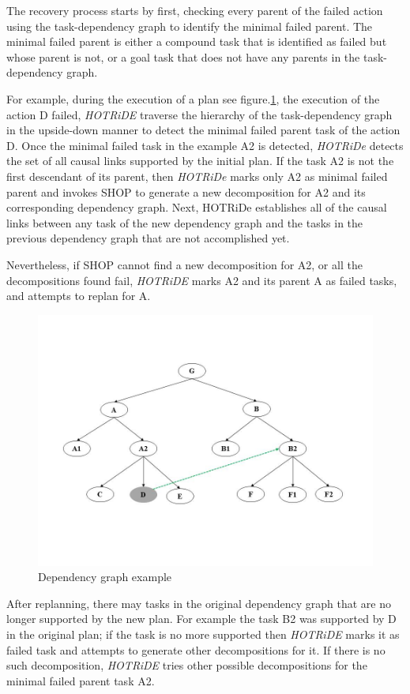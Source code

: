 The recovery process starts by first, checking every parent of the failed action using the task-dependency graph to identify the minimal failed parent. 
The minimal failed parent is either a compound task that is identified as failed but whose parent is not, or a goal task that does not have any parents in the task-dependency graph.

For example, during the execution of a plan see figure.\ref{Dependency graph}, the execution of the action D failed, \textit{HOTRiDE} traverse the hierarchy of the task-dependency graph in the upside-down manner to detect the minimal failed parent task of the action D. 
Once the minimal failed task in the example A2 is detected, \textit{HOTRiDe} detects the set of all causal links supported by the initial plan.
If the task A2 is not the first descendant of its parent, then \textit{HOTRiDe} marks only A2 as minimal failed parent and invokes SHOP to generate a new decomposition for A2 and its corresponding dependency graph. 
Next, HOTRiDe establishes all of the causal links between any task of the new dependency graph and the tasks in the previous dependency graph that are not accomplished yet. 

Nevertheless, if SHOP cannot find a new decomposition for A2, or all the decompositions found fail, \textit{HOTRiDE} marks A2 and its parent A as failed tasks, and attempts to replan for A.

\begin{figure}[h]
	\centering
	\includegraphics[width=.75\columnwidth]{Pictures/hotride.png}
	\caption{\label{Dependency graph} Dependency graph example}
\end{figure}
After replanning, there may tasks in the original dependency graph that are no longer supported by the new plan. For example the task B2 was supported by D in the original plan; if the task is no more supported then \textit{HOTRiDE} marks it as failed task and attempts to generate other decompositions for it. If there is no such decomposition, \textit{HOTRiDE} tries other possible decompositions for the minimal failed parent task A2.

